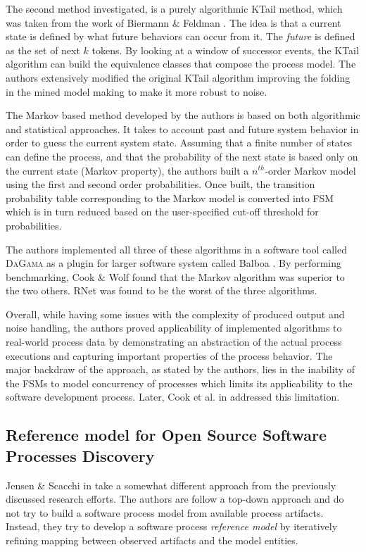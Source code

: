 The second method investigated, is a purely algorithmic KTail method, which was taken from the work of Biermann \& Feldman \cite{citeulike:5120603}. The idea is that a current state is defined by what future behaviors can occur from it. The \textit{future} is defined as the set of next $k$ tokens. By looking at a window of successor events, the KTail algorithm can build the equivalence classes that compose the process model. The authors extensively modified the original KTail algorithm improving the folding in the mined model making to make it more robust to noise.

The Markov based method developed by the authors is based on both algorithmic and statistical approaches. It takes to account past and future system behavior in order to guess the current system state. Assuming that a finite number of states can define the process, and that the probability of the next state is based only on the current state (Markov property), the authors built a $n^{th}$-order Markov model using the first and second order probabilities. Once built, the transition probability table corresponding to the Markov model is converted into FSM which is in turn reduced based on the user-specified cut-off threshold for probabilities.

The authors implemented all three of these algorithms in a software tool called \textsc{DaGama} as a plugin for larger software system called Balboa \cite{citeulike:5120757}. By performing benchmarking, Cook \& Wolf found that the Markov algorithm was superior to the two others. RNet was found to be the worst of the three algorithms. 

Overall, while having some issues with the complexity of produced output and noise handling, the authors proved applicability of implemented algorithms to real-world process data by demonstrating an abstraction of the actual process executions and capturing important properties of the process behavior. The major backdraw of the approach, as stated by the authors, lies in the inability of the FSMs to model concurrency of processes which limits its applicability to the software development process. Later, Cook et al. in \cite{citeulike:5128143} addressed this limitation.

\subsection{Reference model for Open Source Software Processes Discovery}
Jensen \& Scacchi in \cite{citeulike:5043664} take a somewhat different approach from the previously discussed research efforts. The authors are follow a top-down approach and do not try to build a software process model from available process artifacts. Instead, they try to develop a software process \textit{reference model} by iteratively refining mapping between observed artifacts and the model entities. 

